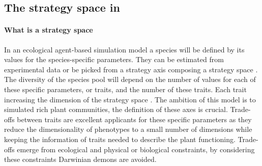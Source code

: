 \subsection{The strategy space in \model}

\paragraph{What is a strategy space}
In an ecological agent-based simulation model a species will be defined by its values for the species-specific parameters. They can be estimated from experimental data \parencite{taubert_modelling_2014, maire_traits_2009,lohier_explaining_2014} or be picked from a strategy axis \parencite{reineking_environmental_2006, kleidon_global_2000} composing a strategy space \parencite{westoby_leaf-height-seed_1998}. The diversity of the species pool will depend on the number of values for each of these specific parameters, or traits, and the number of these traits. Each trait increasing the dimension of the strategy space \parencite{laughlin_intrinsic_2014}. The ambition of this model is to simulated rich plant communities, the definition of these axes is crucial. Trade-offs between traits are excellent applicants for these specific parameters as they reduce the dimensionality of phenotypes to a small number of dimensions \parencite{wright_worldwide_2004, diaz_global_2016, reich_world-wide_2014} while keeping the information of traits needed to describe the plant functioning. Trade-offs emerge from ecological and physical or biological constraints, by considering these constraints Darwinian demons are avoided.\\

